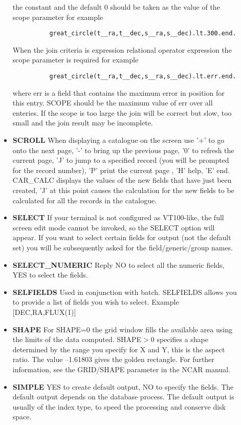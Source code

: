 \begin{description}
\begin{itemize}
the constant and the default 0 should be taken as the value of the
scope parameter for example
\begin{verbatim}
          great_circle(t__ra,t__dec,s__ra,s__dec).lt.300.end.
\end{verbatim}
 When the join criteria is expression relational
operator expression the scope parameter is required for example
\begin{verbatim}
          great_circle(t__ra,t__dec,s__ra,s__dec).lt.err.end.
\end{verbatim}
where err is a field that contains the maximum error in position
for this entry. SCOPE should be the maximum value of err over all
enteries. If the scope is too large the join will be correct but
slow, too small and the join result may be incomplete.
\item{\bf SCROLL} When displaying a catalogue on the screen use '+' to go onto
the next page, '-' to bring up the previous page, '0' to refresh the current
page, 'J' to jump to a specified record (you will be prompted for the record
number), 'P' print the current page , 'H' help, 'E' end. CAR\_CALC displays the
values of the new fields that have just been created, 'J' at this point causes
the calculation for the new fields to be calculated for all the records in the
catalogue.
\item{\bf SELECT} If your terminal is not configured as VT100-like, the full
screen edit mode cannot be invoked, so the SELECT option will appear.
If you want to select certain fields for output (not the default set) you will
be subsequently asked for the field/generic/group names.
\item {\bf SELECT\_NUMERIC} Reply NO to select all the numeric fields, YES
to select the fields.
\item{\bf SELFIELDS} Used in conjunction with batch. SELFIELDS allows you to
provide a list of fields you wish to select. Example [DEC,RA,FLUX(1)]
\item{\bf SHAPE} For SHAPE=0 the grid window fills the available area using
the limits of the data computed.
SHAPE$>$0 specifies a shape determined by the range you specify for X and Y,
this is the aspect ratio.
The value --1.61803 gives the golden rectangle.
For further information, see the GRID/SHAPE parameter in the NCAR manual.
\item{\bf SIMPLE} YES to create default output, NO to specify the fields.
The default output depends on the database process.
The default output is usually of the index type, to speed the processing and
conserve disk space.

\end{itemize}
\end{description}
